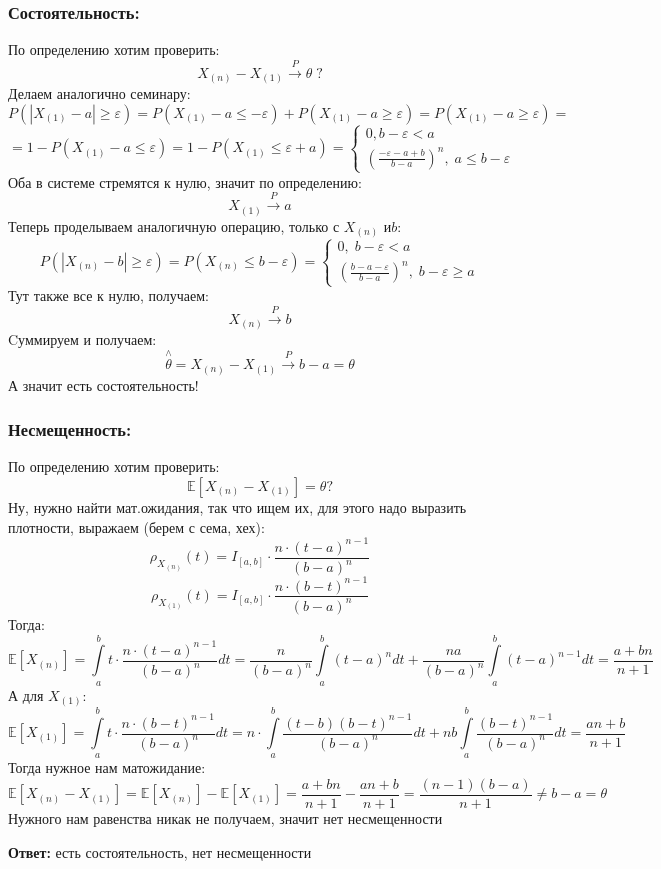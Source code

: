 \documentclass[a4paper,12pt]{article}
\begin{document}
\subsubsection*{Состоятельность:}
По определению хотим проверить:
\[
X_{(n)} - X_{(1)} \overset{P}{\longrightarrow} \theta \; ? 
\]
Делаем аналогично семинару:
\[
P \left(
|X_{(1)} - a | \geq \varepsilon
\right) = 
P \left(
X_{(1)} - a
 \leq -\varepsilon \right)
+ 
P \left(
X_{(1)} - a
\geq \varepsilon \right)  = 
P \left(
X_{(1)} - a
\geq \varepsilon \right)  = 
\]
\[
=
1 - P \left(
X_{(1)} - a
\leq \varepsilon \right)  = 
1 - P \left(
X_{(1)}
\leq \varepsilon  + a\right) = 
\begin{cases}
0,  b - \varepsilon  < a \\
\left(
\frac{-\varepsilon - a + b}{b - a} \right)^n , \; a \leq b  - \varepsilon 
\end{cases}
\]
Оба в системе стремятся к нулю, значит по определению:
\[
X_{(1)} \overset{P}{\longrightarrow} a
\]
Теперь проделываем аналогичную операцию, только с  $X_{(n)}$ и$b$:
\[
P \left(
|X_{(n)} - b | \geq \varepsilon
\right)  = P \left(
X_{(n)} \leq b - \varepsilon
\right) =
\begin{cases}
0, \; b - \varepsilon < a \\
\left(
\frac{b - a - \varepsilon}{b - a}
\right)^n, \; b - \varepsilon \geq a
\end{cases}
\]
Тут также все к нулю, получаем:
\[
X_{(n)} \overset{P}{\longrightarrow} b
\]
Cуммируем и получаем:
\[
\stackrel{\wedge}{\theta}  
=
X_{(n)} - X_{(1)} \overset{P}{\longrightarrow} b - a = \theta 
\]
А значит есть состоятельность!
\subsubsection*{Несмещенность:}
По определению хотим проверить:
\[
\mathbb{E} \left[
X_{(n)} - X_{(1)}
\right] = \theta ?
\]
Ну, нужно найти мат.ожидания, так что ищем их, для этого надо выразить плотности, выражаем (берем с сема, хех):
\[
\rho_{X_{(n)}} (t) = 
I_{[a, b]}
\cdot \frac{n \cdot (t - a)^{n - 1}}{(b - a)^n}
\]
\[
\rho_{X_{(1)}} (t) =I_{[a, b]} \cdot  \frac{n \cdot (b - t)^{n - 1}}{(b - a)^n}
\]
Тогда:
\[
\mathbb{E}\left[
X_{(n)}
\right] = \int\limits_a^b  t \cdot
 \frac{n \cdot (t - a)^{n - 1}}{(b - a)^n} dt = \frac{n}{(b - a)^n} \int\limits_a^b (t - a)^n dt + \frac{na}{(b - a)^n} \int\limits_a^b (t - a)^{n - 1} dt = \frac{a + bn }{n + 1}
\]
А для $X_{(1)}$:
\[
\mathbb{E} \left[
X_{(1)}
\right]
=
\int\limits_a^b  t  \cdot  \frac{n \cdot (b - t)^{n - 1}}{(b - a)^n}dt = n \cdot  \int\limits_a^b  \frac{(t -b )(b -t)^{n - 1}}{(b - a)^n } dt + nb \int\limits_a^b \frac{(b - t)^{n - 1}}{(b -a)^n} dt =  \frac{an + b}{n + 1}
\]
Тогда нужное нам матожидание:
\[
\mathbb{E} \left[
X_{(n)} - X_{(1)}
\right]  = \mathbb{E} \left[
X_{(n)}
\right] - \mathbb{E} \left[
X_{(1)}
\right]  =  \frac{a + bn }{n + 1} - \frac{an + b}{n + 1}  = \frac{(n-1)(b - a)}{n + 1}\neq b-a = \theta 
\]
Нужного нам равенства никак не получаем, значит нет несмещенности
\begin{center}
\textbf{Ответ: } есть состоятельность, нет несмещенности
\end{center}
\end{document}
